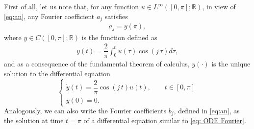 \documentclass[twocolumn]{autart}    %
\begin{document}
First of all,  let us note that, for any function $u\in L^\infty ([0,\pi]; \mathbb{R})$, in view of \eqref{eq:an},  any Fourier coefficient $a_j$ satisfies
\begin{align*}
	a_j = y(\pi), 
\end{align*}
where $y\in C([0,\pi];\mathbb{R})$ is the function defined as
\begin{align*}
	y(t) = \dfrac{2}{\pi} \int_0^t u(\tau) \cos(j\, \tau) d\tau,	
\end{align*}
and as a consequence of the fundamental theorem of calculus, $y(\cdot)$ is the unique solution to the differential equation
\begin{equation}\label{eq: ODE Fourier}
	\begin{cases}
		\dot{y} (t) = \dfrac{2}{\pi} \cos(j\, t) u(t), \qquad  t\in [0,\pi]
		\\[5pt]
		y(0) = 0.
	\end{cases}
\end{equation}
Analogously, we can also write the Fourier coefficients $b_j$, defined in \eqref{eq:an}, as the solution at time $t=\pi$ of a differential equation similar to \eqref{eq: ODE Fourier}.
\end{document}
